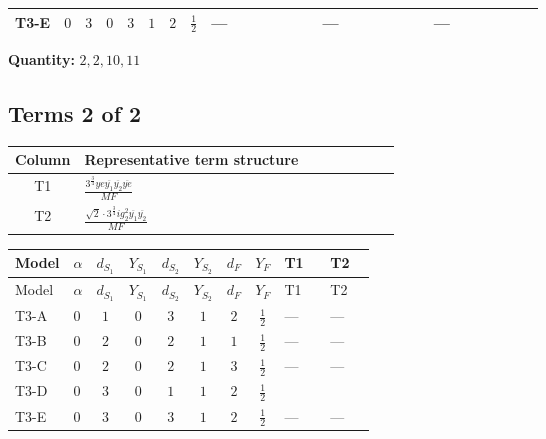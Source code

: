 \documentclass[8pt]{article}
\begin{document}
\begin{landscape}
\begin{longtable}{@{}llcccccc >{\raggedright\arraybackslash}p{0.21\linewidth} >{\raggedright\arraybackslash}p{0.21\linewidth} >{\raggedright\arraybackslash}p{0.21\linewidth}@{}}
\midrule
T3-E & $0$ & $3$ & $0$ & $3$ & $1$ & $2$ & $\frac{1}{2}$ & --- & --- & --- \\
\midrule
\bottomrule
\end{longtable}
\clearpage
\noindent\textbf{Quantity: }$\mathrm{2,2,10,11}$\par\smallskip
\subsection*{Terms 2 of 2}
\begin{center}
\begin{tabular}{@{}c >{\raggedright\arraybackslash}p{0.82\linewidth}@{}}
\toprule
Column & Representative term structure \\
\midrule
T1 & \(\displaystyle \frac{3^{\frac{3}{4}} ye \overline{y_{1}} \overline{y_{2}} \overline{ye}}{MF}\) \\
\midrule
T2 & \(\displaystyle \frac{\sqrt{2} \cdot 3^{\frac{3}{4}} i g_{2}^{2} \overline{y_{1}} \overline{y_{2}}}{MF}\) \\
\midrule
\bottomrule
\end{tabular}
\end{center}
\smallskip
\tiny
\begin{longtable}{@{}llcccccc >{\raggedright\arraybackslash}p{0.21\linewidth} >{\raggedright\arraybackslash}p{0.21\linewidth}@{}}
\toprule
Model & $\alpha$ & $d_{S_1}$ & $Y_{S_1}$ & $d_{S_2}$ & $Y_{S_2}$ & $d_F$ & $Y_F$ & T1 & T2 \\
\midrule
\endfirsthead
\toprule
Model & $\alpha$ & $d_{S_1}$ & $Y_{S_1}$ & $d_{S_2}$ & $Y_{S_2}$ & $d_F$ & $Y_F$ & T1 & T2 \\
\midrule
\endhead
T3-A & $0$ & $1$ & $0$ & $3$ & $1$ & $2$ & $\frac{1}{2}$ & --- & --- \\
\midrule
T3-B & $0$ & $2$ & $0$ & $2$ & $1$ & $1$ & $\frac{1}{2}$ & --- & --- \\
\midrule
T3-C & $0$ & $2$ & $0$ & $2$ & $1$ & $3$ & $\frac{1}{2}$ & --- & --- \\
\midrule
T3-D & $0$ & $3$ & $0$ & $1$ & $1$ & $2$ & $\frac{1}{2}$ & \scriptsize\adjustbox{max width=\linewidth}{$\begin{gathered} \frac{3^{\frac{3}{4}} ye \overline{y_{1}} \overline{y_{2}} \overline{ye}}{12 MF}\end{gathered}$} & \scriptsize\adjustbox{max width=\linewidth}{$\begin{gathered} \frac{\sqrt{2} \cdot 3^{\frac{3}{4}} i g_{2}^{2} \overline{y_{1}} \overline{y_{2}}}{3 MF}\end{gathered}$} \\
\midrule
T3-E & $0$ & $3$ & $0$ & $3$ & $1$ & $2$ & $\frac{1}{2}$ & --- & --- \\
\midrule
\bottomrule
\end{longtable}
\clearpage

\end{landscape}
\end{document}
